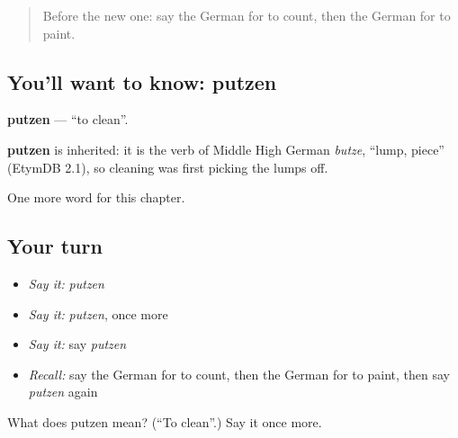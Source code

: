\begin{quote}
Before the new one: say the German for to count, then the German for to paint.
\end{quote}

\subsection*{You'll want to know: putzen}
\textbf{putzen} — \textquotedblleft{}to clean\textquotedblright{}.

\begin{cousinweb}
\textbf{putzen} is inherited: it is the verb of Middle High German \emph{butze}, \textquotedblleft{}lump, piece\textquotedblright{} (EtymDB 2.1), so cleaning was first picking the lumps off.
\end{cousinweb}

\begin{grammarlens}[title={What you've built}]
One more word for this chapter.
\end{grammarlens}

\subsection*{Your turn}
\begin{itemize}
\raggedright
  \item \emph{Say it:} \emph{putzen}
  \item \emph{Say it:} \emph{putzen}, once more
  \item \emph{Say it:} say \emph{putzen}
  \item \emph{Recall:} say the German for to count, then the German for to paint, then say \emph{putzen} again
\end{itemize}

\begin{tcolorbox}[breakable,colback=teal!4,colframe=teal!35!black,title={Before you move on}]
What does putzen mean? (\textquotedblleft{}To clean\textquotedblright{}.) Say it once more.
\end{tcolorbox}

